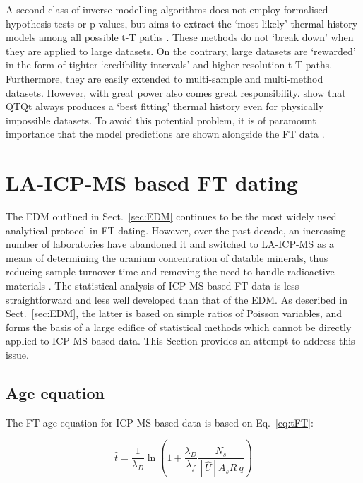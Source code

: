 \documentclass{article}
\begin{document}
A second class of inverse modelling algorithms \citep[including
  QTQt,][]{gallagher2012} does not employ formalised hypothesis tests
or p-values, but aims to extract the `most likely' thermal history
models among all possible t-T paths \citep{gallagher1995,
  willett1997}. These methods do not `break down' when they are
applied to large datasets. On the contrary, large datasets are
`rewarded' in the form of tighter `credibility intervals' and higher
resolution t-T paths. Furthermore, they are easily extended to
multi-sample and multi-method datasets. However, with great power also
comes great responsibility. \citet{vermeesch2014} show that QTQt
always produces a `best fitting' thermal history even for physically
impossible datasets. To avoid this potential problem, it is of
paramount importance that the model predictions are shown alongside
the FT data \citep{gallagher2012, gallagher2016, vermeesch2014}.

\section{LA-ICP-MS based FT dating}
\label{sec:ICP}

The EDM outlined in Sect.~\ref{sec:EDM} continues to be the most
widely used analytical protocol in FT dating. However, over the past
decade, an increasing number of laboratories have abandoned it and
switched to LA-ICP-MS as a means of determining the uranium
concentration of datable minerals, thus reducing sample turnover time
and removing the need to handle radioactive materials
\citep{hasebe2004, hasebe2009, chew2012, soares2014, abdullin2016,
  vermeesch2017}. The statistical analysis of ICP-MS based FT data is
less straightforward and less well developed than that of the EDM. As
described in Sect.~\ref{sec:EDM}, the latter is based on simple ratios
of Poisson variables, and forms the basis of a large edifice of
statistical methods which cannot be directly applied to ICP-MS based
data. This Section provides an attempt to address this issue.

\subsection{Age equation}
\label{sec:ICPage}

The FT age equation for ICP-MS based data is based on
Eq.~\ref{eq:tFT}:

\begin{equation}
\hat{t} = \frac{1}{\lambda_D}
\ln \left(1 + \frac{\lambda_D}{\lambda_f}\frac{N_s}{[\hat{U}] A_s R ~ q}\right)
\label{eq:tICP}
\end{equation}
\end{document}
